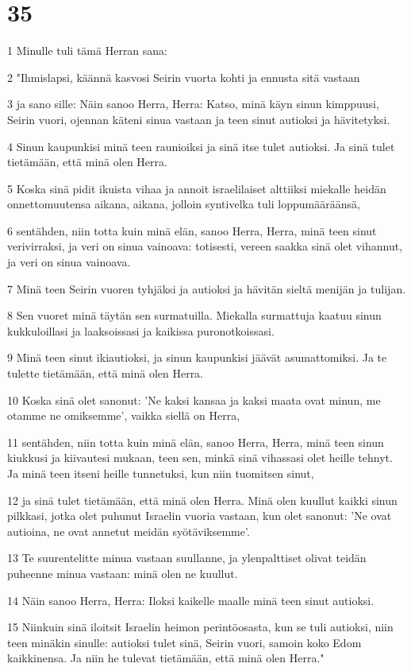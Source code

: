 \chapter{35}

\par 1 Minulle tuli tämä Herran sana:
\par 2 "Ihmislapsi, käännä kasvosi Seirin vuorta kohti ja ennusta sitä vastaan
\par 3 ja sano sille: Näin sanoo Herra, Herra: Katso, minä käyn sinun kimppuusi, Seirin vuori, ojennan käteni sinua vastaan ja teen sinut autioksi ja hävitetyksi.
\par 4 Sinun kaupunkisi minä teen raunioiksi ja sinä itse tulet autioksi. Ja sinä tulet tietämään, että minä olen Herra.
\par 5 Koska sinä pidit ikuista vihaa ja annoit israelilaiset alttiiksi miekalle heidän onnettomuutensa aikana, aikana, jolloin syntivelka tuli loppumääräänsä,
\par 6 sentähden, niin totta kuin minä elän, sanoo Herra, Herra, minä teen sinut verivirraksi, ja veri on sinua vainoava: totisesti, vereen saakka sinä olet vihannut, ja veri on sinua vainoava.
\par 7 Minä teen Seirin vuoren tyhjäksi ja autioksi ja hävitän sieltä menijän ja tulijan.
\par 8 Sen vuoret minä täytän sen surmatuilla. Miekalla surmattuja kaatuu sinun kukkuloillasi ja laaksoissasi ja kaikissa puronotkoissasi.
\par 9 Minä teen sinut ikiautioksi, ja sinun kaupunkisi jäävät asumattomiksi. Ja te tulette tietämään, että minä olen Herra.
\par 10 Koska sinä olet sanonut: 'Ne kaksi kansaa ja kaksi maata ovat minun, me otamme ne omiksemme', vaikka siellä on Herra,
\par 11 sentähden, niin totta kuin minä elän, sanoo Herra, Herra, minä teen sinun kiukkusi ja kiivautesi mukaan, teen sen, minkä sinä vihassasi olet heille tehnyt. Ja minä teen itseni heille tunnetuksi, kun niin tuomitsen sinut,
\par 12 ja sinä tulet tietämään, että minä olen Herra. Minä olen kuullut kaikki sinun pilkkasi, jotka olet puhunut Israelin vuoria vastaan, kun olet sanonut: 'Ne ovat autioina, ne ovat annetut meidän syötäviksemme'.
\par 13 Te suurentelitte minua vastaan suullanne, ja ylenpalttiset olivat teidän puheenne minua vastaan: minä olen ne kuullut.
\par 14 Näin sanoo Herra, Herra: Iloksi kaikelle maalle minä teen sinut autioksi.
\par 15 Niinkuin sinä iloitsit Israelin heimon perintöosasta, kun se tuli autioksi, niin teen minäkin sinulle: autioksi tulet sinä, Seirin vuori, samoin koko Edom kaikkinensa. Ja niin he tulevat tietämään, että minä olen Herra."

